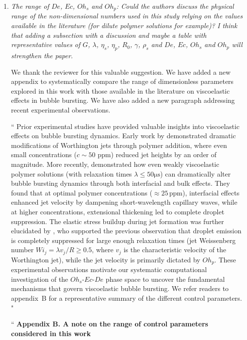 \documentclass[]{article}
\newcommand{\oo}{\color{magenta} \normalfont}
\newcommand{\bb}{\color{black} \normalfont}
\begin{document}
\begin{enumerate}
\item \textit{The range of $De$, $Ec$, $Oh_s$ and $Oh_p$: Could the authors discuss the physical range of the
non-dimensional numbers used in this study relying on the values available in the
literature (for dilute polymer solutions for example)? I think that adding a subsection
with a discussion and maybe a table with representative values of $G$, $\lambda$, $\eta_s$, $\eta_p$, $R_0$, $\gamma$, $\rho_s$ and $De$, $Ec$, $Oh_s$ and $Oh_p$ will strengthen the paper.}

We thank the reviewer for this valuable suggestion. We have added a new appendix to systematically compare the range of dimensionless parameters explored in this work with those available in the literature on viscoelastic effects in bubble bursting. We have also added a new paragraph addressing recent experimental observations.

``\oo Prior experimental studies have provided valuable insights into viscoelastic effects on bubble bursting dynamics. Early work by \citet{cheny1996extravagant} demonstrated dramatic modifications of Worthington jets through polymer addition, where even small concentrations ($c \sim 50$ ppm) reduced jet heights by an order of magnitude.
More recently, \citet{rodriguez2023bubble} demonstrated how even weakly viscoelastic polymer solutions (with relaxation times $\lambda \leq 50\si{\micro\second}$) can dramatically alter bubble bursting dynamics through both interfacial and bulk effects. They found that at optimal polymer concentrations ($\approx 25\,\text{ppm}$), interfacial effects enhanced jet velocity by dampening short-wavelength capillary waves, while at higher concentrations, extensional thickening led to complete droplet suppression.
The elastic stress buildup during jet formation was further elucidated by \citet{cabalganteeffect}, who supported the previous observation that droplet emission is completely suppressed for large enough relaxation times (jet Weissenberg number $Wi_j = \lambda v_j/R \ge 0.5$, where $v_j$ is the characteristic velocity of the Worthington jet), while the jet velocity is primarily dictated by $Oh_p$. These experimental observations motivate our systematic computational investigation of the $Oh_s$-$Ec$-$De$ phase space to uncover the fundamental mechanisms that govern viscoelastic bubble bursting. We refer readers to appendix~B for a representative summary of the different control parameters.\bb"

``\oo
\textbf{Appendix B. A note on the range of control parameters considered in this work}


\end{enumerate}
\end{document}
